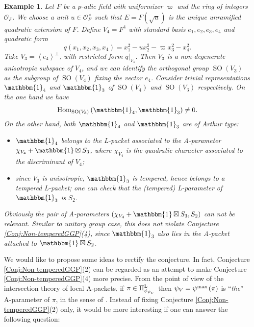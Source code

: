 \documentclass[11pt,letterpaper]{amsart}
\theoremstyle{plain}
\newcounter{theorem}[section]
\numberwithin{theorem}{section}
\numberwithin{equation}{subsection}
\newtheorem{Exm}[theorem]{Example}
\theoremstyle{remark}
\newcommand{\Hom}{\operatorname{Hom}}
\newcommand{\SO}{\operatorname{SO}}
\def\calO{\mathcal{O}}
\def\LP{\Pi^{\rm L}} %
\begin{document}
\begin{Exm}\label{E:so-counterex}
Let $F$ be a $p$-adic field with uniformizer $\varpi$ and the ring of integers $\calO_F$. We choose a unit $u \in \calO_F^\times$ such that $E = F(\sqrt{u})$ is the unique unramified quadratic extension of $F$. Define $V_4 = F^4$ with standard basis $e_1, e_2, e_3, e_4$ and quadratic form
\[
    q\left(x_1, x_2, x_3, x_4\right) = x_1^2 - u x_2^2 - \varpi x_3^2 - x_4^2.
\]
Take $V_3 = \left\langle e_4\right\rangle^\perp$, with restricted form $q\big|_{V_3}$. Then $V_3$ is a non-degenerate anisotropic subspace of $V_4$, and we can identify the orthogonal group $\SO\left(V_3\right)$ as the subgroup of $\SO\left(V_4\right)$ fixing the vector $e_4$. Consider trivial representations $\mathbbm{1}_4$ and $\mathbbm{1}_3$ of $\SO\left(V_4\right)$ and $\SO\left(V_3\right)$ respectively. On the one hand we have
\[
    \Hom_{\SO\left(V_3\right)}\left(\mathbbm{1}_4,\mathbbm{1}_3\right)\neq 0.
\]  
On the other hand, both $\mathbbm{1}_4$ and $\mathbbm{1}_3$ are of Arthur type: 
\begin{itemize}
    \item $\mathbbm{1}_4$ belongs to the L-packet associated to the A-parameter $\chi_{V_4}+\mathbbm{1}\boxtimes S_3$, where $\chi_{V_4}$ is the quadratic character associated to the discriminant of $V_4$;

    \vskip 5pt

    \item since $V_3$ is anisotropic, $\mathbbm{1}_3$ is tempered, hence belongs to a tempered L-packet; one can check that the (tempered) L-parameter of $\mathbbm{1}_3$ is $S_2$.
\end{itemize}
\vskip 5pt 
Obviously the pair of A-parameters $\left(\chi_{V_4}+\mathbbm{1}\boxtimes S_3, S_2\right)$ can not be relevant. Similar to unitary group case, this does not violate Conjecture \ref{Conj:Non-temperedGGP}(4), since $\mathbbm{1}_3$ also lies in the A-packet attached to $\mathbbm{1}\boxtimes S_2$.
\end{Exm}

\vskip 5pt

We would like to propose some ideas to rectify the conjecture. In fact, Conjecture \ref{Conj:Non-temperedGGP}(2) can be regarded as an attempt to make Conjecture \ref{Conj:Non-temperedGGP}(4) more precise. From the point of view of the intersection theory of local A-packets, if $\pi\in\LP_{\phi_{\psi_V}}$ then $\psi_V=\psi^{\rm max}\left(\pi\right)$ is ``\emph{the}'' A-parameter of $\pi$, in the sense of \cite{MR4912257}. Instead of fixing Conjecture \ref{Conj:Non-temperedGGP}(2) only, it would be more interesting if one can answer the following question:
\end{document}
